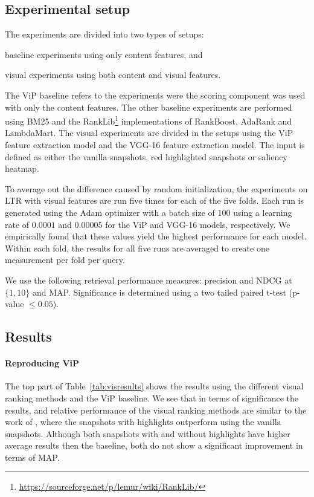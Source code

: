 \subsection{Experimental setup}
The experiments are divided into two types of setups:
\begin{inparaenum}[(i)]
\item baseline experiments using only content features, and
\item visual experiments using both content and visual features.
\end{inparaenum}

The ViP baseline refers to the experiments were the scoring component was used with only the content features. The other baseline experiments are performed using BM25 and the RankLib\footnote{\url{https://sourceforge.net/p/lemur/wiki/RankLib/}} implementations of RankBoost, AdaRank and LambdaMart.
The visual experiments are divided in the setups using the ViP feature extraction model and the VGG-16 feature extraction model. The input is defined as either the vanilla snapshots, red highlighted snapshots or saliency heatmap. 

To average out the difference caused by random initialization, the experiments on \ac{LTR} with visual features are run five times for each of the five folds. 
Each run is generated using the Adam optimizer with a batch size of 100 using a learning rate of $0.0001$ and $0.00005$ for the ViP and VGG-16 models, respectively. We empirically found that these values yield the highest performance for each model.
Within each fold, the results for all five runs are averaged to create one measurement per fold per query.

We use the following retrieval performance measures: precision and NDCG at $\{1,10\}$ and MAP.
Significance is determined using a two tailed paired t-test (p-value $\leq 0.05$). 

\subsection{Results}

\paragraph{Reproducing ViP}
The top part of Table~\ref{tab:visresults} shows the results using the different visual ranking methods and the ViP baseline. 
We see that in terms of significance the results, and relative performance of the visual ranking methods are similar to the work of \citet{fan2017learning}, where the snapshots with highlights outperform using the vanilla snapshots. Although both snapshots with and without highlights have higher average results then the baseline, both do not show a significant improvement in terms of MAP.

